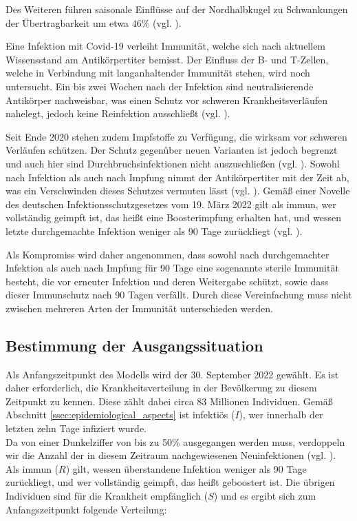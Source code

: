 \documentclass[../main.tex]{subfiles}
\begin{document}
    Des Weiteren führen saisonale Einflüsse auf der Nordhalbkugel zu Schwankungen der Übertragbarkeit um etwa $46\%$ (vgl. \cite[S. 1]{Liu+21}).

    Eine Infektion mit Covid-19 verleiht Immunität, welche sich nach aktuellem Wissensstand am Antikörpertiter bemisst. Der Einfluss der B- und T-Zellen, welche in Verbindung mit langanhaltender Immunität stehen, wird noch untersucht. Ein bis zwei Wochen nach der Infektion sind neutralisierende Antikörper nachweisbar, was einen Schutz vor schweren Krankheitsverläufen nahelegt, jedoch keine Reinfektion ausschließt (vgl. \cite[Immune responses and immunity to SARS-CoV-2]{ECDC22}).

    Seit Ende 2020 stehen zudem Impfstoffe zu Verfügung, die wirksam vor schweren Verläufen schützen. Der Schutz gegenüber neuen Varianten ist jedoch begrenzt und auch hier sind Durchbruchsinfektionen nicht auszuschließen (vgl. \cite[Vaccines]{ECDC22}).
    Sowohl nach Infektion als auch nach Impfung nimmt der Antikörpertiter mit der Zeit ab, was ein Verschwinden dieses Schutzes vermuten lässt (vgl. \cite[Immunität]{RKI21}). Gemäß einer Novelle des deutschen Infektionsschutzgesetzes vom 19. März 2022 gilt als immun, wer vollständig geimpft ist, das heißt eine Boosterimpfung erhalten hat, und wessen letzte durchgemachte Infektion weniger als 90 Tage zurückliegt (vgl. \cite[§22a (1,2)]{IfSG22}).

    Als Kompromiss wird daher angenommen, dass sowohl nach durchgemachter Infektion als auch nach Impfung für 90 Tage eine sogenannte sterile Immunität besteht, die vor erneuter Infektion und deren Weitergabe schützt, sowie dass dieser Immunschutz nach 90 Tagen verfällt. Durch diese Vereinfachung muss nicht zwischen mehreren Arten der Immunität unterschieden werden. 

    \subsection{Bestimmung der Ausgangssituation}
    \label{ssec:initial_state}
    Als Anfangszeitpunkt des Modells wird der 30. September 2022 gewählt. Es ist daher erforderlich, die Krankheitsverteilung in der Bevölkerung zu diesem Zeitpunkt zu kennen. Diese zählt dabei circa 83 Millionen Individuen.
    Gemäß Abschnitt \ref{ssec:epidemiological_aspects} ist infektiös ($I$), wer innerhalb der letzten zehn Tage infiziert wurde. \\Da von einer Dunkelziffer von bis zu 50\% ausgegangen werden muss, verdoppeln wir die Anzahl der in diesem Zeitraum nachgewiesenen Neuinfektionen (vgl. \cite[S. 2]{Pri+21}).
    Als immun ($R$) gilt, wessen überstandene Infektion weniger als 90 Tage zurückliegt, und wer vollständig geimpft, das heißt geboostert ist. Die übrigen Individuen sind für die Krankheit empfänglich ($S$) und es ergibt sich zum Anfangszeitpunkt folgende Verteilung:
\end{document}
